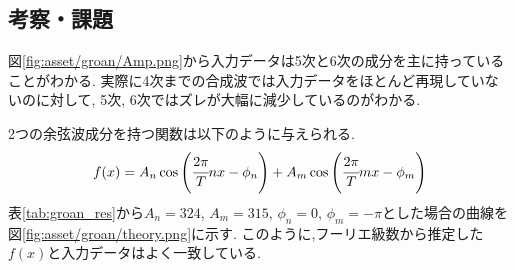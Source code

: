 \subsection{考察・課題}
図\ref{fig:asset/groan/Amp.png}から入力データは5次と6次の成分を主に持っていることがわかる.
実際に4次までの合成波では入力データをほとんど再現していないのに対して, 5次, 6次ではズレが大幅に減少しているのがわかる.

2つの余弦波成分を持つ関数は以下のように与えられる.
\begin{align*}
  f(x)=A_n\cos\left(\cfrac{2\pi}{T}nx-\phi_n\right)+A_m\cos\left(\cfrac{2\pi}{T}mx-\phi_m\right)
\end{align*}
表\ref{tab:groan_res}から$A_n=324$, $A_m=315$, $\phi_n=0$, $\phi_m=-\pi$とした場合の曲線を図\ref{fig:asset/groan/theory.png}に示す.
このように,フーリエ級数から推定した$f(x)$と入力データはよく一致している.
